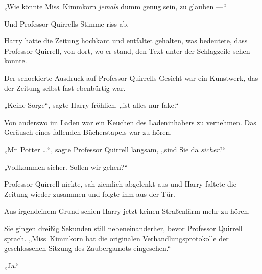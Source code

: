 „Wie könnte Miss~Kimmkorn \emph{jemals} dumm genug sein, zu glauben —“

Und Professor Quirrells Stimme riss ab.

Harry hatte die Zeitung hochkant und entfaltet gehalten, was bedeutete, dass Professor Quirrell, von dort, wo er stand, den Text unter der Schlagzeile sehen konnte.

Der schockierte Ausdruck auf Professor Quirrells Gesicht war ein Kunstwerk, das der Zeitung selbst fast ebenbürtig war.

„Keine Sorge“, sagte Harry fröhlich, „ist alles nur fake.“

Von anderswo im Laden war ein Keuchen des Ladeninhabers zu vernehmen. Das Geräusch eines fallenden Bücherstapels war zu hören.

„Mr~Potter …“, sagte Professor Quirrell langsam, „sind Sie da \emph{sicher}?“

„Vollkommen sicher. Sollen wir gehen?“

Professor Quirrell nickte, sah ziemlich abgelenkt aus und Harry faltete die Zeitung wieder zusammen und folgte ihm aus der Tür.

Aus irgendeinem Grund schien Harry jetzt keinen Straßenlärm mehr zu hören.

Sie gingen dreißig Sekunden still nebeneinanderher, bevor Professor Quirrell sprach.
„Miss~Kimmkorn hat die originalen Verhandlungsprotokolle der geschlossenen Sitzung des Zaubergamots eingesehen.“

„Ja.“


